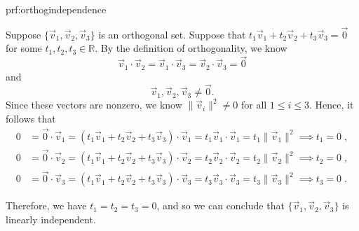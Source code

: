 \begin{prf}{prf:orthogindependence} %

Suppose $\{\vec{v}_1, \vec{v}_2, \vec{v}_3\}$ is an orthogonal set. Suppose that $t_1\vec{v}_1 + t_2\vec{v}_2 + t_3\vec{v}_3 = \vec{0}$ for some $t_1, t_2, t_3 \in \mathbb{R}.$  By the definition of orthogonality, we know 
$$\vec{v}_1 \cdot \vec{v}_2 = \vec{v}_1 \cdot \vec{v}_3 = \vec{v}_2 \cdot \vec{v}_3 = \vec{0}$$ and \[\vec{v}_1, \vec{v}_2, \vec{v}_3 \neq \vec{0}.\] Since these vectors are nonzero, we know $\lVert \vec{v}_i \rVert^2 \neq 0$ for all $1\leq i \leq 3$.  Hence, it follows that
\begin{align*}
    0 &= \vec{0} \cdot \vec{v}_1 = \left(t_1\vec{v}_1 + t_2\vec{v}_2 + t_3\vec{v}_3\right) \cdot \vec{v}_1 = t_1\vec{v}_1 \cdot \vec{v}_1  = t_1 \lVert \vec{v}_1 \rVert^2 \implies t_1 = 0\;, \\
    0 &= \vec{0} \cdot \vec{v}_2 = \left(t_1\vec{v}_1 + t_2\vec{v}_2 + t_3\vec{v}_3\right) \cdot \vec{v}_2 = t_2\vec{v}_2 \cdot \vec{v}_2  = t_2 \lVert \vec{v}_2 \rVert^2 \implies t_2 = 0\;, \\
    0 &= \vec{0} \cdot \vec{v}_3 = \left(t_1\vec{v}_1 + t_2\vec{v}_2 + t_3\vec{v}_3\right) \cdot \vec{v}_3 = t_3\vec{v}_3 \cdot \vec{v}_3  = t_3 \lVert \vec{v}_3 \rVert^2 \implies t_3 = 0\;.
\end{align*}

Therefore, we have $t_1=t_2=t_3=0$, and so we can conclude that $\{\vec{v}_1, \vec{v}_2,\vec{v}_3\}$ is linearly independent.
\end{prf} 